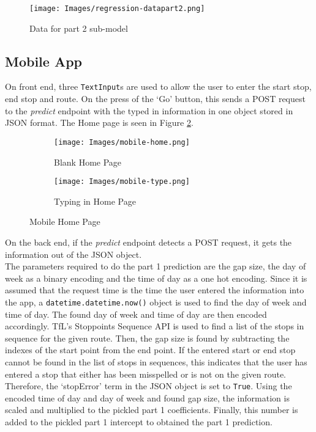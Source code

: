 \begin{figure}[H]
\begin{center}
    \texttt{[image: Images/regression-datapart2.png]}
    \caption{Data for part 2 sub-model}
    \label{fig:regression-part2}
\end{center}
\end{figure}

\subsection{Mobile App}

On front end, three \texttt{TextInput}s are used to allow the user to enter the start stop, end stop and route. On the press of the `Go' button, this sends a POST request to the \textit{predict} endpoint with the typed in information in one object stored in JSON format. The Home page is seen in Figure \ref{fig:mobile-home}.

\begin{figure} [H]
    \centering
    \begin{subfigure}{.5\textwidth}
      \centering
      \texttt{[image: Images/mobile-home.png]}
      \caption{Blank Home Page}
    \end{subfigure}%
    \begin{subfigure}{.5\textwidth}
      \centering
      \texttt{[image: Images/mobile-type.png]}
      \caption{Typing in Home Page}
    \end{subfigure}
    \caption{Mobile Home Page}
    \label{fig:mobile-home}
\end{figure}

On the back end, if the \textit{predict} endpoint detects a POST request, it gets the information out of the JSON object. \\

The parameters required to do the part 1 prediction are the gap size, the day of week as a binary encoding and the time of day as a one hot encoding. Since it is assumed that the request time is the time the user entered the information into the app, a \texttt{datetime.datetime.now()} object is used to find the day of week and time of day. The found day of week and time of day are then encoded accordingly. TfL's Stoppoints Sequence API is used to find a list of the stops in sequence for the given route. Then, the gap size is found by subtracting the indexes of the start point from the end point. If the entered start or end stop cannot be found in the list of stops in sequences, this indicates that the user has entered a stop that either has been misspelled or is not on the given route. Therefore, the `stopError' term in the JSON object is set to \texttt{True}. Using the encoded time of day and day of week and found gap size, the information is scaled and multiplied to the pickled part 1 coefficients. Finally, this number is added to the pickled part 1 intercept to obtained the part 1 prediction. \\


